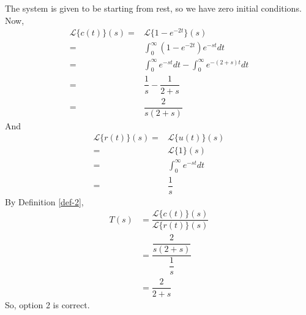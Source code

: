 \documentclass[journal,12pt,twocolumn]{IEEEtran}
\begin{document}
The system is given to be starting from rest, so we have zero initial conditions.\\
Now,
\begin{align}
    \mathcal{L}\{c(t)\}(s)=&\mathcal{L}\{1-e^{-2t}\}(s)\\
    =&\int_0^\infty(1-e^{-2t})e^{-st}dt\\
    =&\int_0^\infty e^{-st}dt - \int_0^\infty e^{-(2+s)t}dt\\
    =&\dfrac{1}{s} - \dfrac{1}{2+s}\\
    =&\dfrac{2}{s(2+s)}
\end{align}
And
\begin{align}
    \mathcal{L}\{r(t)\}(s)=&\mathcal{L}\{u(t)\}(s)\\
    =&\mathcal{L}\{1\}(s)\\
    =&\int_0^\infty e^{-st}dt\\
    =&\dfrac{1}{s}
\end{align}
By Definition \ref{def-2},
\begin{align}
    T(s)&=\dfrac{\mathcal{L}\{c(t)\}(s)}{\mathcal{L}\{r(t)\}(s)}\\
    &=\dfrac{\dfrac{2}{s(2+s)}}{\dfrac{1}{s}}\\
    &=\dfrac{2}{2+s}
\end{align}
So, option 2 is correct.
\end{document}
